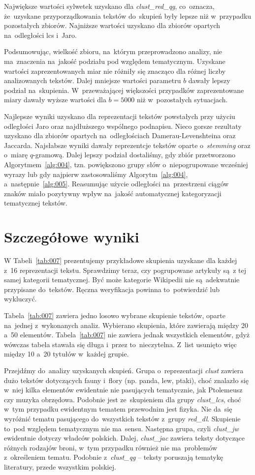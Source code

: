 \documentclass{praca1}
\begin{document}
Największe wartości sylwetek uzyskano dla \emph{clust\_red\_qg}, co~oznacza, że~uzyskane przyporządkowania tekstów do~skupień były lepsze niż w~przypadku pozostałych zbiorów. Najniższe wartości uzyskano dla zbiorów opartych na~odległości lcs i~Jaro.


Podsumowując, wielkość zbioru, na~którym przeprowadzono analizy, nie ma~znaczenia na~jakość podziału pod względem tematycznym. Uzyskane wartości zaprezentowanych miar nie różniły się znacząco dla różnej liczby analizowanych tekstów. Dalej mniejsze wartości parametru $b$ dawały lepszy podział na~skupienia. W~przeważającej większości przypadków zaprezentowane miary dawały wyższe wartości dla $b=5000$ niż w~pozostałych sytuacjach.

Najlepsze wyniki uzyskano dla reprezentacji tekstów powstałych przy użyciu odległości Jaro oraz najdłuższego wspólnego podnapisu. Nieco gorsze rezultaty uzyskano dla zbiorów opartych na~odległościach Damerau-Levenshteina oraz Jaccarda. Najsłabsze wyniki dawały reprezentcje tekstów oparte o~\emph{stemming} oraz o~miarę $q$-gramową. Dalej lepszy podział dostaliśmy, gdy zbiór przetworzono Algorytmem~\ref{alg:004}, tzn. powiększono grupy słów o~niepogrupowane wcześniej wyrazy lub gdy najpierw zastosowaliśmy Algorytm~\ref{alg:004}, a~następnie~\ref{alg:005}. Reasumując użycie odległości na~przestrzeni ciągów znaków miało pozytywny wpływ na~jakość automatycznej kategoryzacji tematycznej tekstów.

\section{Szczegółowe wyniki}

W Tabeli~\ref{tab:007} prezentujemy przykładowe skupienia uzyskane dla każdej z~16 reprezentacji tekstu. Sprawdzimy teraz, czy pogrupowane artykuły są~z tej samej kategorii tematycznej. Być może kategorie Wikipedii nie są~adekwatnie przypisane do~tekstów. Ręczna weryfikacja powinna to~potwierdzić lub wykluczyć. 

Tabela~\ref{tab:007} zawiera jedno losowo wybrane skupienie tekstów, oparte na~jednej z~wykonanych analiz. Wybierano skupienia, które zawierają między 20 a~50 elementów. Tabela~\ref{tab:007} nie zawiera jednak wszystkich elementów, gdyż wówczas tabela stawała się długa i~przez to~nieczytelna. Z~list usunięto więc między 10 a~20 tytułów w~każdej grupie.

Przejdźmy do~analizy uzyskanych skupień. Grupa o~reprezentacji \emph{clust} zawiera dużo tekstów dotyczących fauny i~flory (np. panda, lew, ptaki), choć znalazło się w~niej kilka elementów ewidentnie nie pasujących tematycznie, jak Ptolemeusz czy muzyka obrzędowa. Podobnie jest ze~skupieniem dla grupy \emph{clust\_lcs}, choć w~tym przypadku ewidentnym tematem przewodnim jest fizyka. Nie da~się wyróżnić tematu pasującego do~wszystkich tekstów z~grupy \emph{red\_dl}. Skupienie to~pod względem tematycznym nie ma~sensu. Następna grupa, czyli \emph{clust\_jw} ewidentnie dotyczy władców polskich. Dalej, \emph{clust\_jac} zawiera teksty dotyczące różnych rodzajów broni, w~tym przypadku również nie ma~problemów z~określeniem tematu. Podobnie z~\emph{clust\_qg} -- teksty poruszają tematykę literatury, przede wszystkim polskiej. 
\end{document}
